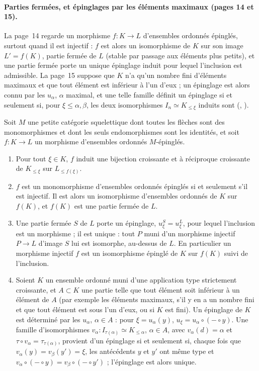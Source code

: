 \paragraph{Parties fermées, et épinglages par les éléments maximaux (pages 14 et 15).} La page~14 regarde un morphisme $f : K \to L$ d'ensembles ordonnés épinglés, surtout quand il est injectif : $f$ est alors un isomorphisme de $K$ sur son image $L' = f(K)$, partie fermée de $L$ (stable par passage aux éléments plus petits), et une partie fermée porte un unique épinglage induit pour lequel l'inclusion est admissible. La page~15 suppose que $K$ n'a qu'un nombre fini d'éléments maximaux et que tout élément est inférieur à l'un d'eux ; un épinglage est alors connu par les $u_\alpha$, $\alpha$ maximal, et une telle famille définit un épinglage si et seulement si, pour $\xi \leq \alpha, \beta$, les deux isomorphismes $I_n \simeq K_{\leq \xi}$ induits sont  (, ).

\begin{encadre}
\begin{theoreme}
Soit $M$ une petite catégorie squelettique dont toutes les flèches sont des monomorphismes et dont les seuls endomorphismes sont les identités, et soit $f : K \to L$ un morphisme d'ensembles ordonnés $M$-épinglés.
\begin{enumerate}
\item Pour tout $\xi \in K$, $f$ induit une bijection croissante et à réciproque croissante de $K_{\leq \xi}$ sur $L_{\leq f(\xi)}$.
\item $f$ est un monomorphisme d'ensembles ordonnés épinglés si et seulement s'il est injectif. Il est alors un isomorphisme d'ensembles ordonnés de $K$ sur $f(K)$, et $f(K)$ est une partie fermée de $L$.
\item Une partie fermée $S$ de $L$ porte un épinglage, $u^S_\xi = u^L_\xi$, pour lequel l'inclusion est un morphisme ; il est unique : tout $P$ muni d'un morphisme injectif $P \to L$ d'image $S$ lui est isomorphe, au-dessus de $L$. En particulier un morphisme injectif $f$ est un isomorphisme épinglé de $K$ sur $f(K)$ suivi de l'inclusion.
\item Soient $K$ un ensemble ordonné muni d'une application type strictement croissante, et $A \subset K$ une partie telle que tout élément soit inférieur à un élément de $A$ (par exemple les éléments maximaux, s'il y en a un nombre fini et que tout élément est sous l'un d'eux, ou si $K$ est fini). Un épinglage de $K$ est déterminé par les $u_\alpha$, $\alpha \in A$ : pour $\xi = u_\alpha(y)$, $u_\xi = u_\alpha \circ (- \circ y)$. Une famille d'isomorphismes $v_\alpha : I_{\tau(\alpha)} \simeq K_{\leq \alpha}$, $\alpha \in A$, avec $v_\alpha(d) = \alpha$ et $\tau \circ v_\alpha = \tau_{\tau(\alpha)}$, provient d'un épinglage si et seulement si, chaque fois que $v_\alpha(y) = v_\beta(y') = \xi$, les antécédents $y$ et $y'$ ont même type et $v_\alpha \circ (- \circ y) = v_\beta \circ (- \circ y')$ ; l'épinglage est alors unique.
\end{enumerate}
\end{theoreme}
\end{encadre}

